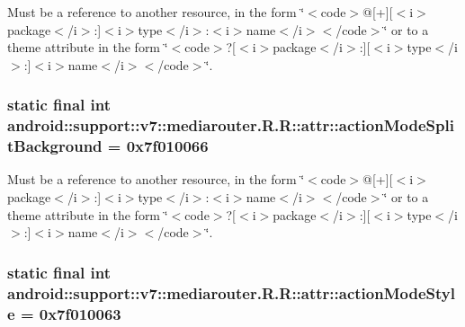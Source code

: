 Must be a reference to another resource, in the form \char`\"{}$<$code$>$@\mbox{[}+\mbox{]}\mbox{[}$<$i$>$package$<$/i$>$:\mbox{]}$<$i$>$type$<$/i$>$:$<$i$>$name$<$/i$>$$<$/code$>$\char`\"{} or to a theme attribute in the form \char`\"{}$<$code$>$?\mbox{[}$<$i$>$package$<$/i$>$:\mbox{]}\mbox{[}$<$i$>$type$<$/i$>$:\mbox{]}$<$i$>$name$<$/i$>$$<$/code$>$\char`\"{}. \hypertarget{classandroid_1_1support_1_1v7_1_1mediarouter_1_1_r_1_1attr_41f390d7c3d6f8cb7b2f010ff51ccb67}{
\subsubsection[{actionModeSplitBackground}]{\setlength{\rightskip}{0pt plus 5cm}static final int android::support::v7::mediarouter.R.R::attr::actionModeSplitBackground = 0x7f010066}}
\label{classandroid_1_1support_1_1v7_1_1mediarouter_1_1_r_1_1attr_41f390d7c3d6f8cb7b2f010ff51ccb67}


Must be a reference to another resource, in the form \char`\"{}$<$code$>$@\mbox{[}+\mbox{]}\mbox{[}$<$i$>$package$<$/i$>$:\mbox{]}$<$i$>$type$<$/i$>$:$<$i$>$name$<$/i$>$$<$/code$>$\char`\"{} or to a theme attribute in the form \char`\"{}$<$code$>$?\mbox{[}$<$i$>$package$<$/i$>$:\mbox{]}\mbox{[}$<$i$>$type$<$/i$>$:\mbox{]}$<$i$>$name$<$/i$>$$<$/code$>$\char`\"{}. \hypertarget{classandroid_1_1support_1_1v7_1_1mediarouter_1_1_r_1_1attr_86eee712ece99095840d5fd86652e284}{
\subsubsection[{actionModeStyle}]{\setlength{\rightskip}{0pt plus 5cm}static final int android::support::v7::mediarouter.R.R::attr::actionModeStyle = 0x7f010063}}
\label{classandroid_1_1support_1_1v7_1_1mediarouter_1_1_r_1_1attr_86eee712ece99095840d5fd86652e284}


